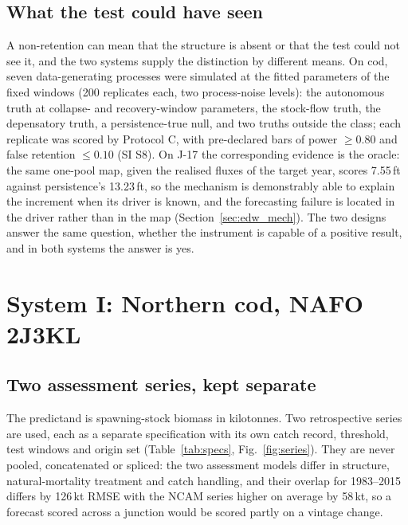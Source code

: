 \documentclass[preprint,11pt,authoryear]{elsarticle}
\theoremstyle{definition}
\theoremstyle{remark}
\begin{document}
\subsection{What the test could have seen}\label{sec:power}

A non-retention can mean that the structure is absent or that the test could not see it, and the two systems supply the distinction by different means. On cod, seven data-generating processes were simulated at the fitted parameters of the fixed windows (200 replicates each, two process-noise levels): the autonomous truth at collapse- and recovery-window parameters, the stock-flow truth, the depensatory truth, a persistence-true null, and two truths outside the class; each replicate was scored by Protocol C, with pre-declared bars of power $\ge 0.80$ and false retention $\le 0.10$ (SI S8). On J-17 the corresponding evidence is the oracle: the same one-pool map, given the realised fluxes of the target year, scores 7.55\,ft against persistence's 13.23\,ft, so the mechanism is demonstrably able to explain the increment when its driver is known, and the forecasting failure is located in the driver rather than in the map (Section~\ref{sec:edw_mech}). The two designs answer the same question, whether the instrument is capable of a positive result, and in both systems the answer is yes.
\FloatBarrier
\section{System I: Northern cod, NAFO 2J3KL}\label{sec:cod}

\subsection{Two assessment series, kept separate}\label{sec:specs}

The predictand is spawning-stock biomass in kilotonnes. Two retrospective series are used, each as a separate specification with its own catch record, threshold, test windows and origin set (Table~\ref{tab:specs}, Fig.~\ref{fig:series}). They are never pooled, concatenated or spliced: the two assessment models differ in structure, natural-mortality treatment and catch handling, and their overlap for 1983--2015 differs by 126\,kt RMSE with the NCAM series higher on average by 58\,kt, so a forecast scored across a junction would be scored partly on a vintage change.
\end{document}
